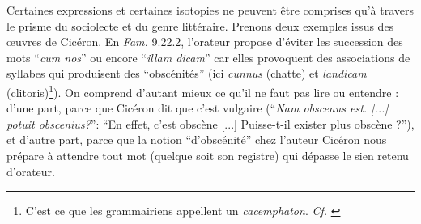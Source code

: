Certaines expressions et certaines isotopies ne peuvent être comprises qu'à travers le prisme du sociolecte et du genre littéraire. Prenons deux exemples issus des œuvres de Cicéron. En \textit{Fam.} 9.22.2, l'orateur propose d'éviter les succession des mots \enquote{\textit{cum nos}} ou encore \enquote{\textit{illam dicam}} car elles provoquent des associations de syllabes qui produisent des \enquote{obscénités} (ici \textit{cunnus} (chatte) et \textit{landicam} (clitoris)\footnote{C'est ce que les grammairiens appellent un \textit{cacemphaton}. \textit{Cf.} \textcite{nicolas2007gros}}). On comprend d'autant mieux ce qu'il ne faut pas lire ou entendre : d'une part, parce que Cicéron dit que c'est vulgaire (\enquote{\textit{Nam obscenus est. [...] potuit obscenius?}}: \enquote{En effet, c'est obscène [...] Puisse-t-il exister plus obscène ?}), et d'autre part, parce que la notion \enquote{d'obscénité} chez l'auteur Cicéron nous prépare à attendre tout mot (quelque soit son registre) qui dépasse le sien retenu d'orateur. %
